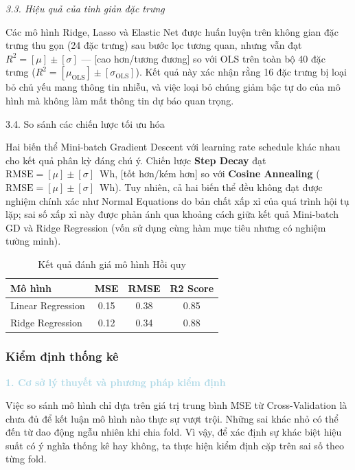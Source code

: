 \noindent\textcolor{infocolor}{\textit{3.3. Hiệu quả của tinh giản đặc trưng}}

Các mô hình Ridge, Lasso và Elastic Net được huấn luyện trên không gian 
đặc trưng thu gọn (24 đặc trưng) sau bước lọc tương quan, nhưng vẫn đạt 
$R^2 = [\mu] \pm [\sigma]$ --- [cao hơn/tương đương] so với OLS trên 
toàn bộ 40 đặc trưng ($R^2 = [\mu_{\mathrm{OLS}}] \pm [\sigma_{\mathrm{OLS}}]$). 
Kết quả này xác nhận rằng 16 đặc trưng bị loại bỏ chủ yếu mang thông 
tin nhiễu, và việc loại bỏ chúng giảm bậc tự do của 
mô hình mà không làm mất thông tin dự báo quan trọng.

\noindent\textcolor{infocolor}{3.4. So sánh các chiến lược tối ưu hóa}

Hai biến thể Mini-batch Gradient Descent với 
learning rate schedule khác nhau cho kết quả phân kỳ đáng chú ý. 
Chiến lược \textbf{Step Decay} đạt $\mathrm{RMSE} = [\mu] \pm [\sigma]$~Wh, 
[tốt hơn/kém hơn] so với \textbf{Cosine Annealing} 
($\mathrm{RMSE} = [\mu] \pm [\sigma]$~Wh). Tuy nhiên, cả hai biến thể 
đều không đạt được nghiệm chính xác như Normal Equations do bản chất 
xấp xỉ của quá trình hội tụ lặp; sai số xấp xỉ này được phản ánh qua 
khoảng cách giữa kết quả Mini-batch GD và Ridge Regression (vốn sử dụng 
cùng hàm mục tiêu nhưng có nghiệm tường minh).

\begin{table}[H]
\centering
\caption{Kết quả đánh giá mô hình Hồi quy}
\begin{tabular}{|l|c|c|c|}
\hline
\textbf{Mô hình} & \textbf{MSE} & \textbf{RMSE} & \textbf{R2 Score} \\ \hline
Linear Regression & 0.15 & 0.38 & 0.85 \\ \hline
Ridge Regression  & 0.12 & 0.34 & 0.88 \\ \hline
\end{tabular}
\end{table}

\subsubsection{Kiểm định thống kê}

\noindent\textcolor{lightblue}{\textbf{1. Cơ sở lý thuyết và phương pháp kiểm định}}

Việc so sánh mô hình chỉ dựa trên giá trị trung bình MSE từ Cross-Validation là chưa đủ để kết luận mô hình nào thực sự vượt trội. Những sai khác nhỏ có thể đến từ dao động ngẫu nhiên khi chia fold. Vì vậy, để xác định sự khác biệt hiệu suất có ý nghĩa thống kê hay không, ta thực hiện kiểm định cặp trên sai số theo từng fold.


